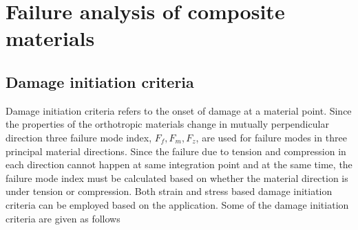 \documentclass[a4paper,12pt]{article}
\begin{document}
\newpage
\section{Failure analysis of composite materials}
\subsection{Damage initiation criteria}
\indent\indent\indent  Damage initiation criteria refers to the onset of damage at a material point. Since the properties of the orthotropic materials change in mutually perpendicular direction three failure mode index, $F_{f}, F_{m}, F_{z}$, are used for failure modes in three principal material directions. Since the failure due to tension and compression in each direction cannot happen at same integration point and at the same time, the failure mode index must be calculated based on whether the material direction is under tension or compression. Both strain and stress based damage initiation criteria can be employed based on the application. Some of the damage initiation criteria are given as follows
\\
\end{document}
